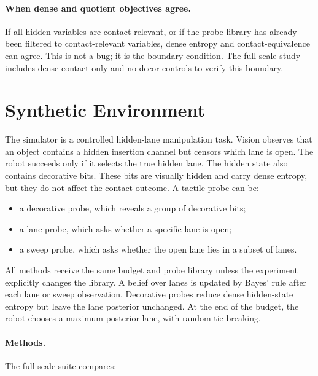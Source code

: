 \documentclass{article}
\begin{document}
\paragraph{When dense and quotient objectives agree.}
If all hidden variables are contact-relevant, or if the probe library has already been filtered to contact-relevant variables, dense entropy and contact-equivalence can agree. This is not a bug; it is the boundary condition. The full-scale study includes dense contact-only and no-decor controls to verify this boundary.

\section{Synthetic Environment}

The simulator is a controlled hidden-lane manipulation task. Vision observes that an object contains a hidden insertion channel but censors which lane is open. The robot succeeds only if it selects the true hidden lane. The hidden state also contains decorative bits. These bits are visually hidden and carry dense entropy, but they do not affect the contact outcome. A tactile probe can be:

\begin{itemize}
    \item a decorative probe, which reveals a group of decorative bits;
    \item a lane probe, which asks whether a specific lane is open;
    \item a sweep probe, which asks whether the open lane lies in a subset of lanes.
\end{itemize}

All methods receive the same budget and probe library unless the experiment explicitly changes the library. A belief over lanes is updated by Bayes' rule after each lane or sweep observation. Decorative probes reduce dense hidden-state entropy but leave the lane posterior unchanged. At the end of the budget, the robot chooses a maximum-posterior lane, with random tie-breaking.

\paragraph{Methods.}
The full-scale suite compares:
\end{document}
